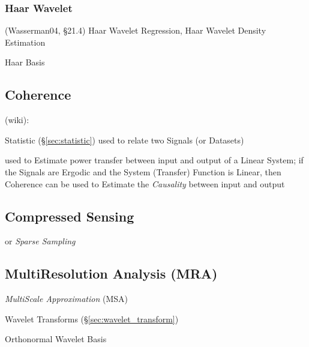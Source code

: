 \subsubsection{Haar Wavelet}\label{sec:haar_wavelet}

(Wasserman04, \S21.4) Haar Wavelet Regression, Haar Wavelet Density Estimation

Haar Basis



\subsection{Coherence}\label{sec:signal_coherence}

(wiki):

Statistic (\S\ref{sec:statistic}) used to relate two Signals (or Datasets)

used to Estimate power transfer between input and output of a Linear System; if
the Signals are Ergodic and the System (Transfer) Function is Linear, then
Coherence can be used to Estimate the \emph{Causality} between input and output



\subsection{Compressed Sensing}\label{sec:compressed_sensing}

or \emph{Sparse Sampling}



\subsection{MultiResolution Analysis (MRA)}\label{sec:multiresolution_analysis}

\emph{MultiScale Approximation} (MSA)

Wavelet Transforms (\S\ref{sec:wavelet_transform})

Orthonormal Wavelet Basis



